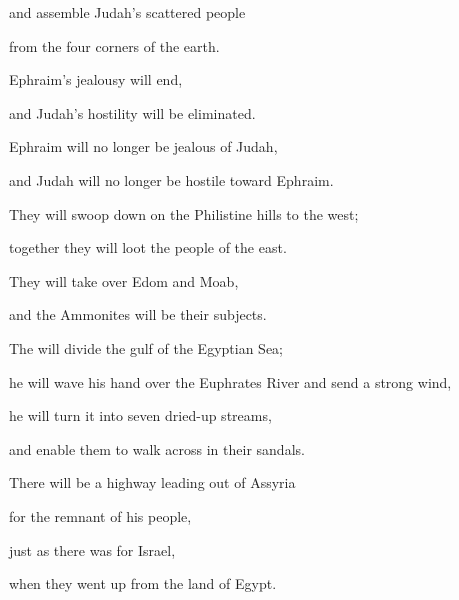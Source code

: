 {\par }{\Q and assemble
Judah’s
scattered
people
\par }{\Q from the four
corners
of the earth.
\par }{\Q {}Ephraim’s
jealousy
will end,

\par }{\Q and Judah’s
hostility
will be eliminated.
\par }{\Q Ephraim
will no
longer be jealous
of Judah,
\par }{\Q and Judah
will no
longer be hostile
toward Ephraim.
\par }{\Q {}They will swoop down
on the Philistine
hills
to the west;
\par }{\Q together
they will loot
the
people
of the east.
\par }{\Q They will take over
Edom
and Moab,
\par }{\Q and the Ammonites
will be their subjects.
\par }{\Q {}The
{}
will divide
the gulf
of the Egyptian
Sea;
\par }{\Q he will wave
his hand
over
the Euphrates River
and send a strong
wind,
\par }{\Q he will turn it into seven
dried-up
streams,
\par }{\Q and enable them to walk across
in their sandals.
\par }{\Q {}There will be
a highway
leading
out
of Assyria
\par }{\Q for the remnant
of his people,
\par }{\Q just as
there was
for Israel,
\par }{\Q when
they went up
from the land
of Egypt.

\par }
